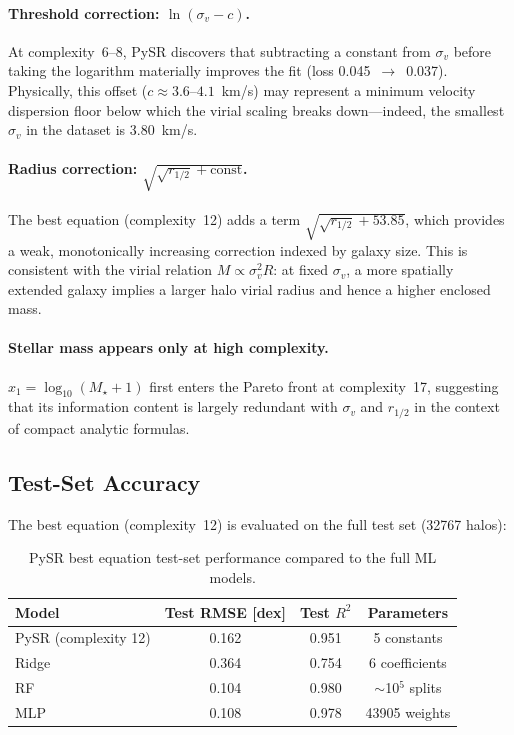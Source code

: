 \documentclass[12pt, a4paper]{article}
\newcommand{\sigmav}{\sigma_v}
\newcommand{\Mstar}{M_\star}
\begin{document}
\paragraph{Threshold correction: $\ln(\sigmav - c)$.}
At complexity~6--8, PySR discovers that subtracting a constant from $\sigmav$ before taking the logarithm materially improves the fit (loss 0.045~$\rightarrow$~0.037).  Physically, this offset ($c \approx 3.6$--$4.1$~km/s) may represent a minimum velocity dispersion floor below which the virial scaling breaks down---indeed, the smallest $\sigmav$ in the dataset is 3.80~km/s.

\paragraph{Radius correction: $\sqrt{\sqrt{r_{1/2}} + \text{const}}$.}
The best equation (complexity~12) adds a term $\sqrt{\sqrt{r_{1/2}} + 53.85}$, which provides a weak, monotonically increasing correction indexed by galaxy size.  This is consistent with the virial relation $M \propto \sigmav^2 R$: at fixed $\sigmav$, a more spatially extended galaxy implies a larger halo virial radius and hence a higher enclosed mass.

\paragraph{Stellar mass appears only at high complexity.}
$x_1 = \log_{10}(\Mstar + 1)$ first enters the Pareto front at complexity~17, suggesting that its information content is largely redundant with $\sigmav$ and $r_{1/2}$ in the context of compact analytic formulas.


\subsection{Test-Set Accuracy}
\label{sec:pysr_test}

The best equation (complexity~12) is evaluated on the full test set (\num{32767} halos):

\begin{table}[H]
  \centering
  \caption{PySR best equation test-set performance compared to the full ML models.}
  \label{tab:pysr_test}
  \begin{tabular}{@{}lccc@{}}
    \toprule
    Model & Test RMSE [dex] & Test $R^2$ & Parameters \\
    \midrule
    PySR (complexity 12) & 0.162 & 0.951 & 5 constants \\
    Ridge                & 0.364 & 0.754 & 6 coefficients \\
    RF                   & 0.104 & 0.980 & $\sim$10$^5$ splits \\
    MLP                  & 0.108 & 0.978 & \num{43905} weights \\
    \bottomrule
  \end{tabular}
\end{table}
\end{document}
